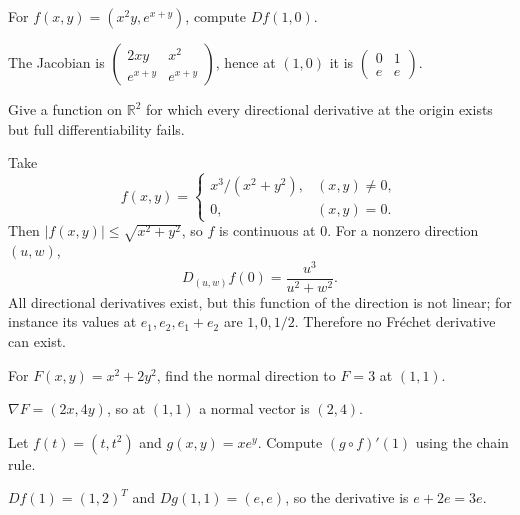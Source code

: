 \begin{problem}\label{prob:ii08-problem-01}
For $f(x,y)=(x^2y,e^{x+y})$, compute $Df(1,0)$.
\end{problem}
\begin{solution}
The Jacobian is $\begin{pmatrix}2xy&x^2\\e^{x+y}&e^{x+y}\end{pmatrix}$, hence at $(1,0)$ it is $\begin{pmatrix}0&1\\e&e\end{pmatrix}$.
\end{solution}

\begin{problem}\label{prob:ii08-problem-02}
Give a function on $\mathbb R^2$ for which every directional derivative at the origin exists but full differentiability fails.
\end{problem}
\begin{solution}
Take
\[
f(x,y)=\begin{cases}x^3/(x^2+y^2),&(x,y)\ne0,\\0,&(x,y)=0.\end{cases}
\]
Then $|f(x,y)|\le\sqrt{x^2+y^2}$, so $f$ is continuous at $0$. For a nonzero direction $(u,w)$,
\[
D_{(u,w)}f(0)=\frac{u^3}{u^2+w^2}.
\]
All directional derivatives exist, but this function of the direction is not linear; for instance its values at $e_1,e_2,e_1+e_2$ are $1,0,1/2$. Therefore no Fr\'echet derivative can exist.
\end{solution}

\begin{problem}\label{prob:ii08-problem-03}
For $F(x,y)=x^2+2y^2$, find the normal direction to $F=3$ at $(1,1)$.
\end{problem}
\begin{solution}
$\nabla F=(2x,4y)$, so at $(1,1)$ a normal vector is $(2,4)$.
\end{solution}

\begin{problem}\label{prob:ii08-problem-04}
Let $f(t)=(t,t^2)$ and $g(x,y)=xe^y$. Compute $(g\circ f)'(1)$ using the chain rule.
\end{problem}
\begin{solution}
$Df(1)=(1,2)^T$ and $Dg(1,1)=(e,e)$, so the derivative is $e+2e=3e$.
\end{solution}

